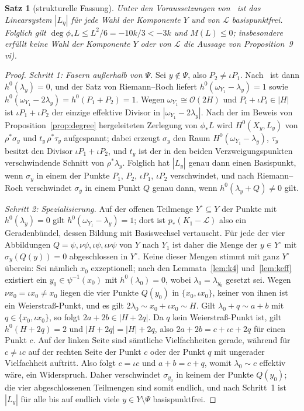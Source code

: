 \documentclass[11pt]{article}
\newtheorem{theorem}{Satz}[section]
\theoremstyle{definition}
\theoremstyle{remark}
\newcommand{\OO}{\mathcal{O}}
\newcommand{\cL}{\mathcal{L}}
\begin{document}
\begin{theorem}[strukturelle Fassung]\label{thm:soule-structural}
Unter den Voraussetzungen von~\cite{So26} ist das Linearsystem $|L_\eta|$ für
jede Wahl der Komponente $Y$ und von $\cL$ basispunktfrei. Folglich gilt
$\deg\phi_*L\le L^2/6=-10k/3<-3k$ und $M(L)\le 0$; insbesondere erfüllt keine
Wahl der Komponente $Y$ oder von $\cL$ die Aussage von Proposition~9\,vi).
\end{theorem}

\begin{proof}
\emph{Schritt 1: Fasern außerhalb von $\Psi$.} Sei $y\notin\Psi$, also
$P_2\ne\iota P_1$. Nach~\cite[Prop.~5\,ii)]{So26} ist dann $h^0(\lambda_y)=0$,
und der Satz von Riemann--Roch liefert $h^0(\omega_{Y_1}-\lambda_y)=1$ sowie
$h^0(\omega_{Y_1}-2\lambda_y)=h^0(P_1+P_2)=1$. Wegen $\omega_{Y_1}\cong\OO(2H)$
und $P_i+\iota P_i\in|H|$ ist $\iota P_1+\iota P_2$ der einzige effektive Divisor
in $|\omega_{Y_1}-2\lambda_y|$. Nach der im Beweis von
Proposition~\ref{prop:degree} hergeleiteten Zerlegung von $\phi_*L$ wird
$H^0(X_y,L_y)$ von $\rho^*\sigma_y$ und $t_y\,\rho^*\tau_y$ aufgespannt; dabei
erzeugt $\sigma_y$ den Raum $H^0(\omega_{Y_1}-\lambda_y)$, $\tau_y$ besitzt den
Divisor $\iota P_1+\iota P_2$, und $t_y$ ist der in den beiden
Verzweigungspunkten verschwindende Schnitt von $\rho^*\lambda_y$. Folglich hat
$|L_y|$ genau dann einen Basispunkt, wenn $\sigma_y$ in einem der Punkte $P_1$,
$P_2$, $\iota P_1$, $\iota P_2$ verschwindet, und nach Riemann--Roch verschwindet
$\sigma_y$ in einem Punkt $Q$ genau dann, wenn $h^0(\lambda_y+Q)\ne 0$ gilt.

\emph{Schritt 2: Spezialisierung.} Auf der offenen Teilmenge $Y^\circ\subseteq Y$
der Punkte mit $h^0(\lambda_y)=0$ gilt $h^0(\omega_{Y_1}-\lambda_y)=1$; dort ist
$p_*(K_1-\cL)$ also ein Geradenbündel, dessen Bildung mit Basiswechsel
vertauscht. Für jede der vier Abbildungen $Q=\psi,\nu\psi,\iota\psi,\iota\nu\psi$
von $Y$ nach $Y_1$ ist daher die Menge der $y\in Y^\circ$ mit
$\sigma_y(Q(y))=0$ abgeschlossen in $Y^\circ$. Keine dieser Mengen stimmt mit
ganz $Y^\circ$ überein: Sei nämlich $x_0$ exzeptionell; nach den
Lemmata~\ref{lem:k4} und~\ref{lem:keff} existiert ein $y_0\in\psi^{-1}(x_0)$ mit
$h^0(\lambda_0)=0$, wobei $\lambda_0=\lambda_{y_0}$ gesetzt sei. Wegen $\nu x_0=\iota x_0\ne
x_0$ liegen die vier Punkte $Q(y_0)$ in $\{x_0,\iota x_0\}$, keiner von ihnen ist
ein Weierstraß-Punkt, und es gilt $2\lambda_0\sim x_0+\iota x_0\sim H$. Gilt
$\lambda_0+q\sim a+b$ mit $q\in\{x_0,\iota x_0\}$, so folgt $2a+2b\in|H+2q|$. Da
$q$ kein Weierstraß-Punkt ist, gilt $h^0(H+2q)=2$ und $|H+2q|=|H|+2q$, also
$2a+2b=c+\iota c+2q$ für einen Punkt $c$. Auf der linken Seite sind sämtliche Vielfachheiten gerade,
während für $c\ne\iota c$ auf der rechten Seite der Punkt $c$ oder der Punkt $q$
mit ungerader Vielfachheit auftritt. Also folgt $c=\iota c$ und $a+b=c+q$, womit
$\lambda_0\sim c$ effektiv wäre, ein Widerspruch. Daher verschwindet
$\sigma_{y_0}$ in keinem der Punkte $Q(y_0)$; die vier abgeschlossenen Teilmengen
sind somit endlich, und nach Schritt~1 ist $|L_y|$ für alle bis auf endlich viele
$y\in Y\setminus\Psi$ basispunktfrei.


\end{proof}
\end{document}
